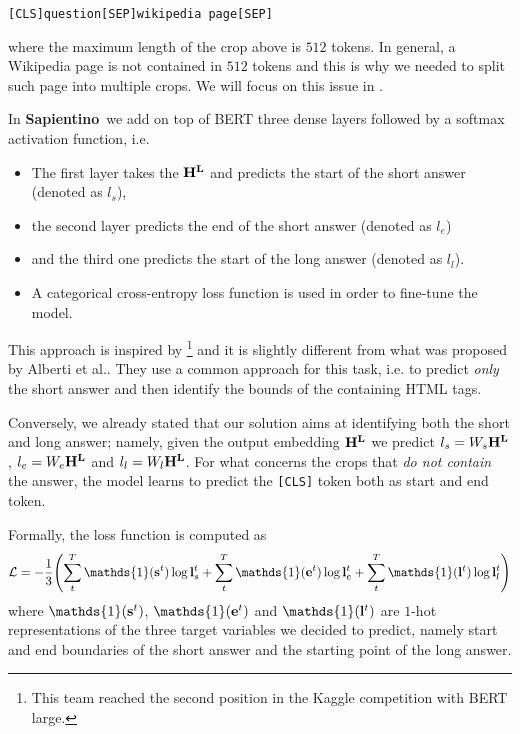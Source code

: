 \documentclass[10pt,hidelinks]{article}
\newcommand\nomefico{\textbf{Sapientino}}
\begin{document}
\begin{center}
    \texttt{[CLS]question[SEP]wikipedia page[SEP]}
\end{center}

where the maximum length of the crop above is $512$ tokens. In general, a Wikipedia page is not contained in $512$ tokens and this is why we needed to split such page into multiple crops. We will focus on this issue in .

\noindent In \nomefico~we add on top of BERT three dense layers followed by a softmax activation function, i.e.
\begin{itemize}
    \item The first layer takes the $\bf H^L$ and predicts the start of the short answer (denoted as $l_s$),
    \item the second layer predicts the end of the short answer (denoted as $l_e$)
    \item and the third one predicts the start of the long answer (denoted as $l_l$).
    \item A categorical cross-entropy loss function is used in order to fine-tune the model.
\end{itemize}
This approach is inspired by \cite{see}\footnote{This team reached the second position in the Kaggle competition with BERT large.} and it is slightly different from what was proposed by Alberti et al..
They use a common approach for this task, i.e. to predict \emph{only} the short answer and then identify the bounds of the containing HTML tags.

Conversely, we already stated that our solution aims at identifying both the short and long answer; namely, given the output embedding ${\bf H^L}$ we predict $l_s = W_s {\bf H^L}$, $l_e = W_e {\bf H^L}$ and $l_l = W_l {\bf H^L}$.
For what concerns the crops that \emph{do not contain} the answer, the model learns to predict the \texttt{[CLS]} token both as start and end token.

Formally, the loss function is computed as
\begin{equation}
    \mathcal{L} = -\frac{1}{3} \Biggl ( \sum_t^T \mathds{1}({\bf s}^t) \log {\bf l}_s^t +  \sum_t^T \mathds{1}({\bf e}^t) \log {\bf l}_e^t +  \sum_t^T \mathds{1}({\bf l}^t) \log {\bf l}_l^t \Biggr )
\end{equation}
where $\mathds{1}({\bf s}^t)$, $\mathds{1}({\bf e}^t)$ and $\mathds{1}({\bf l}^t) $ are $1$-hot representations of the three target variables we decided to predict, namely start and end boundaries of the short answer and the starting point of the long answer.
\end{document}
